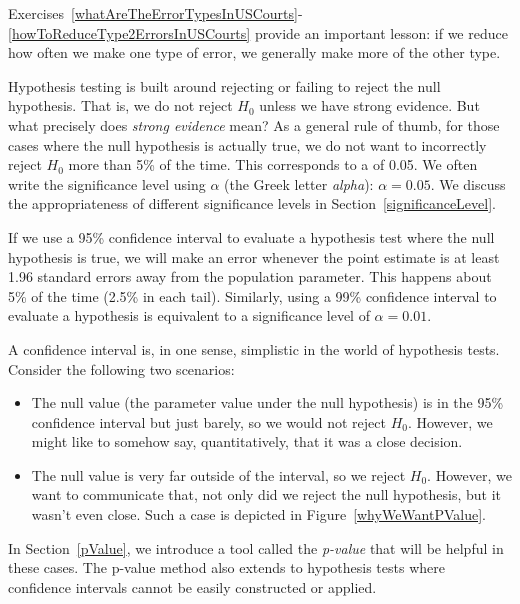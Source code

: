 
Exercises~\ref{whatAreTheErrorTypesInUSCourts}-\ref{howToReduceType2ErrorsInUSCourts} provide an important lesson: if we reduce how often we make one type of error, we generally make more of the other type.

Hypothesis testing is built around rejecting or failing to reject the null hypothesis. That is, we do not reject $H_0$ unless we have strong evidence. But what precisely does \emph{strong evidence} mean? As a general rule of thumb, for those cases where the null hypothesis is actually true, we do not want to incorrectly reject $H_0$ more than 5\% of the time. This corresponds to a  of 0.05. We often write the significance level using $\alpha$ (the Greek letter \emph{alpha}): $\alpha = 0.05$. We discuss the appropriateness of different significance levels in Section~\ref{significanceLevel}. 

If we use a 95\% confidence interval to evaluate a hypothesis test where the null hypothesis is true, we will make an error whenever the point estimate is at least 1.96 standard errors away from the population parameter. This happens about 5\% of the time (2.5\% in each tail). Similarly, using a 99\% confidence interval to evaluate a hypothesis is equivalent to a significance level of $\alpha = 0.01$.

A confidence interval is, in one sense, simplistic in the world of hypothesis tests. Consider the following two scenarios:
\begin{itemize}
\setlength{\itemsep}{0mm}
\item The null value (the parameter value under the null hypothesis) is in the 95\% confidence interval but just barely, so we would not reject $H_0$. However, we might like to somehow say, quantitatively, that it was a close decision.
\item The null value is very far outside of the interval, so we reject $H_0$. However, we want to communicate that, not only did we reject the null hypothesis, but it wasn't even close. Such a case is depicted in Figure~\ref{whyWeWantPValue}.
\end{itemize}
In Section~\ref{pValue}, we introduce a tool called the \emph{p-value} that will be helpful in these cases. The p-value method also extends to hypothesis tests where confidence intervals cannot be easily constructed or applied.

